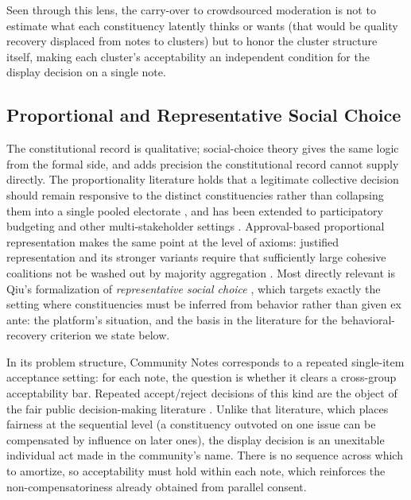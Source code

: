 \documentclass[10pt,twocolumn]{article}
\begin{document}
Seen through this lens, the carry-over to crowdsourced moderation is not to
estimate what each constituency latently thinks or wants (that would be quality
recovery displaced from notes to clusters) but to honor the cluster structure
itself, making each cluster's acceptability an independent condition for the
display decision on a single note.

\subsection*{Proportional and Representative Social Choice}

The constitutional record is qualitative; social-choice theory gives the same
logic from the formal side, and adds precision the constitutional record cannot
supply directly. The proportionality literature holds that a legitimate
collective decision should remain responsive to the distinct constituencies
rather than collapsing them into a single pooled electorate
\citep{peters2019proportionality}, and has been extended to participatory
budgeting and other multi-stakeholder settings \citep{peters2021proportional}.
Approval-based proportional representation makes the same point at the level of
axioms: justified representation and its stronger variants require that
sufficiently large cohesive coalitions not be washed out by majority aggregation
\citep{aziz2015justified,sanchez2017proportional}. Most directly relevant is
Qiu's formalization of \emph{representative social choice}
\citep{qiu2025representative}, which targets exactly the setting where
constituencies must be inferred from behavior rather than given ex ante: the
platform's situation, and the basis in the literature for the behavioral-recovery
criterion we state below.

In its problem structure, Community Notes corresponds to a repeated single-item
acceptance setting: for each note, the question is whether it clears a cross-group
acceptability bar. Repeated accept/reject decisions of this kind are the object
of the fair public decision-making literature
\citep{conitzer2017fair,lackner2020perpetual,skowron2022proportional}. Unlike
that literature, which places fairness at the sequential level (a constituency
outvoted on one issue can be compensated by influence on later ones), the display
decision is an unexitable individual act made in the community's name. There is
no sequence across which to amortize, so acceptability must hold within each
note, which reinforces the non-compensatoriness already obtained from parallel
consent.
\end{document}
